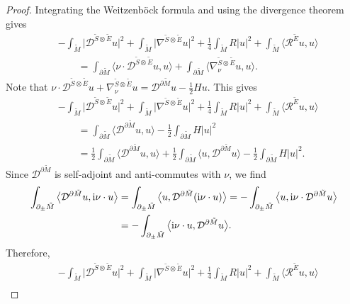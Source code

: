 \documentclass[11pt]{article}
\numberwithin{equation}{section}
\numberwithin{equation}{section}
\begin{document}
\begin{proof}
Integrating the Weitzenb\"ock formula and using the divergence theorem gives
\begin{align*}
&- \int_{\tilde{M}} \big|\mathcal{D}^{\tilde{S} \otimes \tilde{E}} u\big|^2 + \int_{\tilde{M}} \big|\nabla^{\tilde{S} \otimes \tilde{E}} u\big|^2 + \frac{1}{4} \int_{\tilde{M}} R |u|^2 + \int_{\tilde{M}} \big\langle \mathcal{R}^{\tilde{E}} u,u \big\rangle \\
&\qquad= \int_{\partial \tilde{M}} \big\langle \nu \cdot \mathcal{D}^{\tilde{S} \otimes \tilde{E}} u,u \big\rangle + \int_{\partial \tilde{M}} \big\langle \nabla^{\tilde{S} \otimes \tilde{E}}_\nu u,u \big\rangle.
\end{align*}
Note that $\nu \cdot \mathcal{D}^{\tilde{S} \otimes \tilde{E}} u + \nabla^{\tilde{S} \otimes \tilde{E}}_\nu u = \mathcal{D}^{\partial \tilde{M}} u - \frac{1}{2} H u$.
This gives
\begin{align*}
&- \int_{\tilde{M}} \big|\mathcal{D}^{\tilde{S} \otimes \tilde{E}} u\big|^2 + \int_{\tilde{M}} \big|\nabla^{\tilde{S} \otimes \tilde{E}} u\big|^2 + \frac{1}{4} \int_{\tilde{M}} R |u|^2 + \int_{\tilde{M}} \big\langle \mathcal{R}^{\tilde{E}} u,u \big\rangle \\
&\qquad= \int_{\partial \tilde{M}} \big\langle \mathcal{D}^{\partial \tilde{M}} u,u \big\rangle - \frac{1}{2} \int_{\partial \tilde{M}} H |u|^2 \\
&\qquad= \frac{1}{2} \int_{\partial \tilde{M}} \big\langle \mathcal{D}^{\partial \tilde{M}} u,u \big\rangle + \frac{1}{2} \int_{\partial \tilde{M}} \big\langle u,\mathcal{D}^{\partial \tilde{M}} u \big\rangle - \frac{1}{2} \int_{\partial \tilde{M}} H |u|^2.
\end{align*}
Since $\mathcal{D}^{\partial \tilde{M}}$ is self-adjoint and anti-commutes with $\nu$, we find
\begin{align*}
\int_{\partial_\pm \tilde{M}} \big\langle \mathcal{D}^{\partial \tilde{M}} u,{\rm i} \nu \cdot u \big\rangle
&=
\int_{\partial_\pm \tilde{M}} \big\langle u,\mathcal{D}^{\partial \tilde{M}}({\rm i} \nu \cdot u) \big\rangle =
-\int_{\partial_\pm \tilde{M}} \big\langle u,{\rm i} \nu \cdot\mathcal{D}^{\partial \tilde{M}} u \big\rangle \\
&=
-\int_{\partial_\pm \tilde{M}} \big\langle {\rm i} \nu \cdot u,\mathcal{D}^{\partial \tilde{M}} u \big\rangle .
\end{align*}
Therefore,
\begin{align}
& - \int_{\tilde{M}}\big|\mathcal{D}^{\tilde{S} \otimes \tilde{E}} u\big|^2 + \int_{\tilde{M}} \big|\nabla^{\tilde{S} \otimes \tilde{E}} u\big|^2 + \frac{1}{4} \int_{\tilde{M}} R |u|^2 + \int_{\tilde{M}} \big\langle \mathcal{R}^{\tilde{E}} u,u \big\rangle \nonumber\\

\end{align}
\end{proof}
\end{document}
